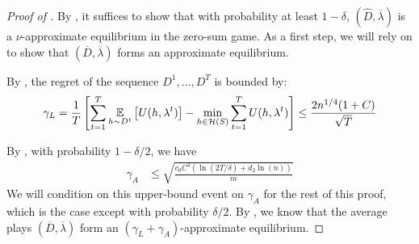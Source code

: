 \begin{proof}[Proof of ]
  By , it suffices to show that with probability at
  least $1 - \delta$, $(\hat D, \overline \lambda)$ is a
  $\nu$-approximate equilibrium in the zero-sum game. As a first step,
  we will rely on  to show that
  $(\overline D, \overline \lambda)$ forms an approximate equilibrium.

  By , the regret of the sequence
  $D^1, \ldots , D^T$ is bounded by:
  \[
    \gamma_L = \frac{1}{T}\left[\sum_{t= 1}^T \operatorname*{\mathbb{E}}_{h\sim D^t}\left[U(h,
        \lambda^t)\right] - \min_{h\in \mathcal{H}(S)}\sum_{t=1}^T U(h, \lambda^t)
    \right] \leq \frac{2 n^{1/4} {(1+C)}}{\sqrt{T}}
  \]


  By , with probability $1 - \delta/2$, we have
\begin{align*}
  \gamma_A &\leq \sqrt{\frac{c_0 C^2 (\ln(2T/\delta) + d_2
        \ln(n))}{m}}
\end{align*}
  We will condition on this upper-bound event on $\gamma_A$ for the
  rest of this proof, which is the case except with probability
  $\delta/2$. By , we know that the average plays
  $(\overline D, \overline \lambda)$ form an
  $(\gamma_L+\gamma_A)$-approximate equilibrium.


\end{proof}
